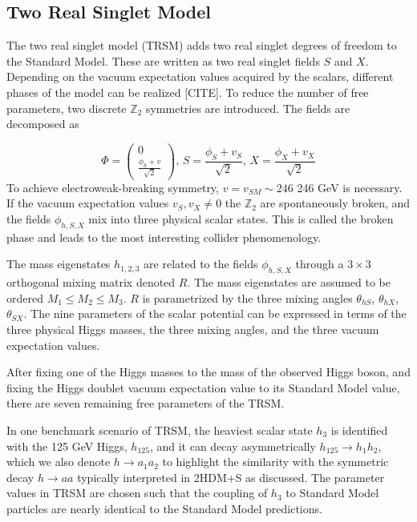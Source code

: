 \documentclass{article}
\begin{document}
\subsection{Two Real Singlet Model}
The two real singlet model (TRSM) adds two real singlet degrees of freedom to the Standard Model. These are written as two real singlet fields $S$ and $X$. Depending on the vacuum expectation values acquired by the scalars, different phases of the model can be realized [CITE]. To reduce the number of free parameters, two discrete $\mathbb{Z}_2$ symmetries are introduced. The fields are decomposed as

\begin{equation}
    \Phi = \begin{pmatrix} 0 \\ \frac{\phi_h + v}{\sqrt{2}} \end{pmatrix}, 
    \,
    S = \frac{\phi_S + v_S}{\sqrt{2}} ,
    \,
    X = \frac{\phi_X + v_X}{\sqrt{2}}
\end{equation}
To achieve electroweak-breaking symmetry, $v  = v_{SM} \sim 246$ 246 GeV is necessary. If the vacuum expectation values $v_S, v_X \neq 0$ the $\mathbb{Z}_2$ are spontaneously broken, and the fields $\phi_{h,S,X}$ mix into three physical scalar states. This is called the broken phase and leads to the most interesting collider phenomenology.

The mass eigenstates $h_{1,2,3}$ are related to the fields $\phi_{h,S,X}$ through a $3\times 3$ orthogonal mixing matrix denoted $R$. The mass eigenstates are assumed to be ordered $M_1 \leq M_2 \leq M_3$. $R$ is parametrized by the three mixing angles $\theta_{hS}$, $\theta_{hX}$, $\theta_{SX}$. The nine parameters of the scalar potential can be expressed in terms of the three physical Higgs masses, the three mixing angles, and the three vacuum expectation values. 

After fixing one of the Higgs masses to the mass of the observed Higgs boson, and fixing the Higgs doublet vacuum expectation value to its Standard Model value, there are seven remaining free parameters of the TRSM.

In one benchmark scenario of TRSM, the heaviest scalar state $h_3$ is identified with the 125 GeV Higgs, $h_{125}$, and it can decay asymmetrically $h_{125} \rightarrow h_1 h_2$, which we also denote $h \rightarrow a_1 a_2$ to highlight the similarity with the symmetric decay $h \rightarrow aa$ typically interpreted in 2HDM+S as discussed. The parameter values in TRSM are chosen such that the coupling of $h_3$ to Standard Model particles are nearly identical to the Standard Model predictions. 
\end{document}
